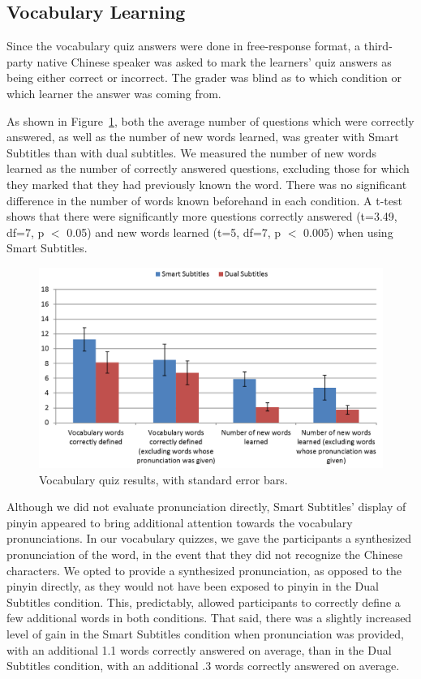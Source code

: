 \documentclass{sigchi}
\begin{document}
\subsection{Vocabulary Learning}

Since the vocabulary quiz answers were done in free-response format, a third-party native Chinese speaker was asked to mark the learners' quiz answers as being either correct or incorrect. The grader was blind as to which condition or which learner the answer was coming from.

As shown in Figure~\ref{fig:figure6}, both the average number of questions which were correctly answered, as well as the number of new words learned, was greater with Smart Subtitles than with dual subtitles. We measured the number of new words learned as the number of correctly answered questions, excluding those for which they marked that they had previously known the word. There was no significant difference in the number of words known beforehand in each condition. A t-test shows that there were significantly more questions correctly answered (t=3.49, df=7, p $<$ 0.05) and new words learned (t=5, df=7, p $<$ 0.005) when using Smart Subtitles.

\begin{figure}[!h]
\centering
\includegraphics[width=\columnwidth]{vocab-quiz-results}
\caption{Vocabulary quiz results, with standard error bars.}
\label{fig:figure6}
\end{figure}

Although we did not evaluate pronunciation directly, Smart Subtitles' display of pinyin appeared to bring additional attention towards the vocabulary pronunciations. In our vocabulary quizzes, we gave the participants a synthesized pronunciation of the word, in the event that they did not recognize the Chinese characters. We opted to provide a synthesized pronunciation, as opposed to the pinyin directly, as they would not have been exposed to pinyin in the Dual Subtitles condition. This, predictably, allowed participants to correctly define a few additional words in both conditions. That said, there was a slightly increased level of gain in the Smart Subtitles condition when pronunciation was provided, with an additional 1.1 words correctly answered on average, than in the Dual Subtitles condition, with an additional .3 words correctly answered on average.
\end{document}
